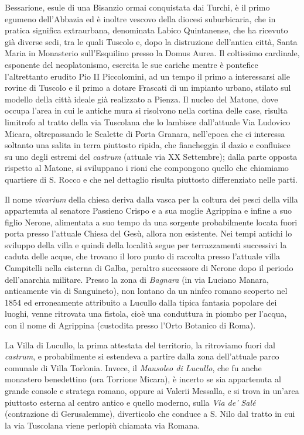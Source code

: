 \documentclass[
  letterpaper,
  DIV=11,
  numbers=noendperiod]{scrartcl}
\begin{document}
Bessarione, esule di una Bisanzio ormai conquistata dai Turchi, è il
primo egumeno dell'Abbazia ed è inoltre vescovo della diocesi
suburbicaria, che in pratica significa extraurbana, denominata Labico
Quintanense, che ha ricevuto già diverse sedi, tra le quali Tuscolo e,
dopo la distruzione dell'antica città, Santa Maria in Monasterio
sull'Esquilino presso la Domus Aurea. Il coltissimo cardinale, esponente
del neoplatonismo, esercita le sue cariche mentre è pontefice
l'altrettanto erudito Pio II Piccolomini, ad un tempo il primo a
interessarsi alle rovine di Tuscolo e il primo a dotare Frascati di un
impianto urbano, stilato sul modello della città ideale già realizzato a
Pienza. Il nucleo del Matone, dove occupa l'area in cui le antiche mura
si risolvono nella cortina delle case, risulta limitrofo al tratto della
via Tuscolana che lo lambisce dall'attuale Via Ludovico Micara,
oltrepassando le Scalette di Porta Granara, nell'epoca che ci interessa
soltanto una salita in terra piuttosto ripida, che fiancheggia il dazio
e confluisce su uno degli estremi del \emph{castrum} (attuale via XX
Settembre); dalla parte opposta rispetto al Matone, si sviluppano i
rioni che compongono quello che chiamiamo quartiere di S. Rocco e che
nel dettaglio risulta piuttosto differenziato nelle parti.

Il nome \emph{vivarium} della chiesa deriva dalla vasca per la coltura
dei pesci della villa appartenuta al senatore Passieno Crispo e a sua
moglie Agrippina e infine a suo figlio Nerone, alimentata a suo tempo da
una sorgente probabilmente locata fuori porta presso l'attuale Chiesa
del Gesù, allora non esistente. Nei tempi antichi lo sviluppo della
villa e quindi della località segue per terrazzamenti successivi la
caduta delle acque, che trovano il loro punto di raccolta presso
l'attuale villa Campitelli nella cisterna di Galba, peraltro successore
di Nerone dopo il periodo dell'anarchia militare. Presso la zona di
\emph{Bagnara} (in via Luciano Manara, anticamente via di Sanguineto),
non lontano da un ninfeo romano scoperto nel 1854 ed erroneamente
attribuito a Lucullo dalla tipica fantasia popolare dei luoghi, venne
ritrovata una fistola, cioè una conduttura in piombo per l'acqua, con il
nome di Agrippina (custodita presso l'Orto Botanico di Roma).

La Villa di Lucullo, la prima attestata del territorio, la ritroviamo
fuori dal \emph{castrum}, e probabilmente si estendeva a partire dalla
zona dell'attuale parco comunale di Villa Torlonia. Invece, il
\emph{Mausoleo di Lucullo}, che fu anche monastero benedettino (ora
Torrione Micara), è incerto se sia appartenuta al grande console e
stratega romano, oppure ai Valerii Messalla, e si trova in un'area
piuttosto esterna al centro antico e quello moderno, sulla \emph{Via de'
Salé} (contrazione di Gerusalemme), diverticolo che conduce a S. Nilo
dal tratto in cui la via Tuscolana viene perlopiù chiamata via Romana.
\end{document}
